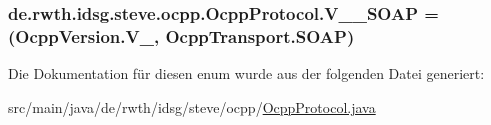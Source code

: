 \hypertarget{enumde_1_1rwth_1_1idsg_1_1steve_1_1ocpp_1_1_ocpp_protocol_a7476dab1a43648c24ed27bb7a6dc4cc1}{
\subsubsection[{V\-\_\-15\-\_\-\-S\-O\-A\-P}]{\setlength{\rightskip}{0pt plus 5cm}de.\-rwth.\-idsg.\-steve.\-ocpp.\-Ocpp\-Protocol.\-V\-\_\-\_\-\-S\-O\-A\-P =({\bf Ocpp\-Version.\-V\-\_}, {\bf Ocpp\-Transport.\-S\-O\-A\-P})}}\label{enumde_1_1rwth_1_1idsg_1_1steve_1_1ocpp_1_1_ocpp_protocol_a7476dab1a43648c24ed27bb7a6dc4cc1}


Die Dokumentation für diesen enum wurde aus der folgenden Datei generiert\-:\begin{DoxyCompactItemize}
\item 
src/main/java/de/rwth/idsg/steve/ocpp/\hyperlink{_ocpp_protocol_8java}{Ocpp\-Protocol.\-java}\end{DoxyCompactItemize}
